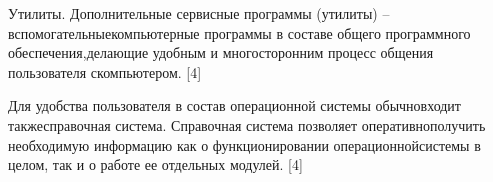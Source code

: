 Утилиты. Дополнительные сервисные программы (утилиты) – вспомогательныекомпьютерные   программы   в   составе   общего   программного   обеспечения,делающие   удобным   и   многосторонним   процесс   общения   пользователя   скомпьютером. [4]

Для   удобства   пользователя   в   состав   операционной   системы   обычновходит такжесправочная система. Справочная система позволяет оперативнополучить необходимую информацию как о функционировании операционнойсистемы в целом, так и о работе ее отдельных модулей. [4]


